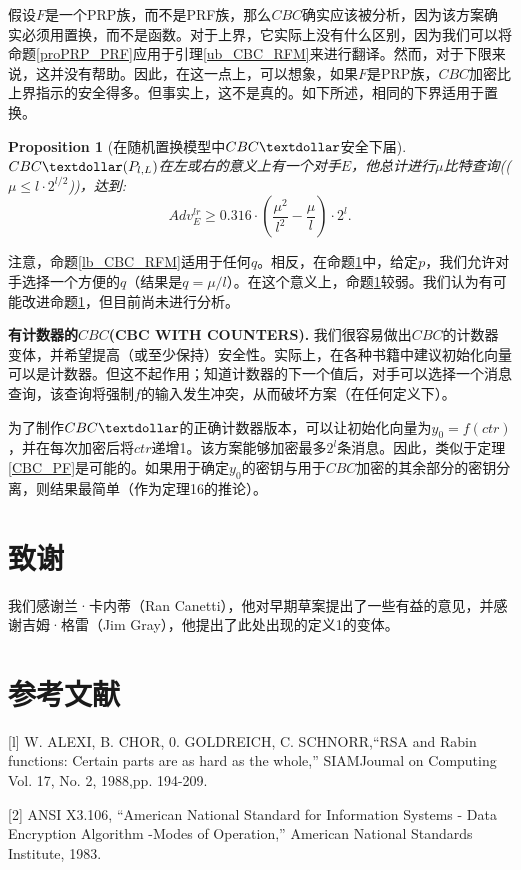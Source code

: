 \documentclass[]{article}
\newtheorem{proposition}{Proposition}
\begin{document}
假设$F$是一个PRP族，而不是PRF族，那么$CBC$确实应该被分析，因为该方案确实必须用置换，而不是函数。对于上界，它实际上没有什么区别，因为我们可以将命题\ref{proPRP_PRF}应用于引理\ref{ub_CBC_RFM}来进行翻译。然而，对于下限来说，这并没有帮助。因此，在这一点上，可以想象，如果$F$是PRP族，$CBC$加密比上界指示的安全得多。但事实上，这不是真的。如下所述，相同的下界适用于置换。

\begin{proposition}[在随机置换模型中$CBC\textdollar$安全下届]\label{lb_CBC_RPM}
		$CBC\textdollar(P_{l,L})$在左或右的意义上有一个对手$E$，他总计进行$\mu$比特查询(($\mu \leq l\cdot 2^{l/2}$))，达到:
		\[Adv^{lr}_{E} \geq 0.316\cdot (\frac{\mu ^2}{l^2}-\frac{\mu}{l})\cdot {2^l}.\]
\end{proposition}

注意，命题\ref{lb_CBC_RFM}适用于任何$q$。相反，在命题\ref{lb_CBC_RPM}中，给定$p$，我们允许对手选择一个方便的$q$（结果是$q=\mu/l$）。在这个意义上，命题\ref{lb_CBC_RPM}较弱。我们认为有可能改进命题\ref{lb_CBC_RPM}，但目前尚未进行分析。

\textbf{{\large 有计数器的$CBC$(CBC WITH COUNTERS).}} 我们很容易做出$CBC$的计数器变体，并希望提高（或至少保持）安全性。实际上，在各种书籍中建议初始化向量可以是计数器。但这不起作用；知道计数器的下一个值后，对手可以选择一个消息查询，该查询将强制$f$的输入发生冲突，从而破坏方案（在任何定义下）。


为了制作$CBC\textdollar$的正确计数器版本，可以让初始化向量为$y_0=f(ctr)$，并在每次加密后将$ctr$递增1。该方案能够加密最多$2^l$条消息。因此，类似于定理\ref{CBC_PF}是可能的。如果用于确定$y_0$的密钥与用于$CBC$加密的其余部分的密钥分离，则结果最简单（作为定理16的推论）。

\section*{致谢}
我们感谢兰·卡内蒂（Ran Canetti），他对早期草案提出了一些有益的意见，并感谢吉姆·格雷（Jim Gray），他提出了此处出现的定义1的变体。

\section*{参考文献}
[l] W. ALEXI, B. CHOR, 0. GOLDREICH, C. SCHNORR,“RSA and Rabin functions: Certain parts are as hard as the
whole,” SIAMJoumal on Computing Vol. 17, No. 2, 1988,pp. 194-209.

[2] ANSI X3.106, “American National Standard for Information Systems - Data Encryption Algorithm -Modes of Operation,” American National Standards Institute, 1983.
\end{document}
